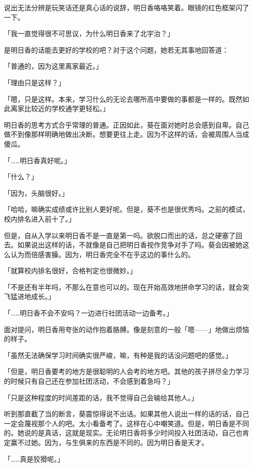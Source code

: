\documentclass[UTF8]{ctexart}
\begin{document}
    说出无法分辨是玩笑话还是真心话的说辞，明日香咯咯笑着。眼镜的红色框架闪了一下。

    「我一直觉得很不可思议，为什么明日香来了北宇治？」

    是明日香的话能去更好的学校的吧？对于这个问题，她若无其事地回答道：

    「普通的，因为这里离家最近。」

    「理由只是这样？」

    「嗯，只是这样。本来，学习什么的无论去哪所高中要做的事都是一样的。既然如此离家比较近的学校通学更轻松。」

    明日香的思考方式合乎常理的普通。正因如此，葵在面对她时总会感到自卑。自己做不到像那样明确地做出决断。想要更往上走。因为不这样的话，会被周围人当成傻瓜。

    「……明日香真好呢。」

    「什么？」

    「因为，头脑很好。」

    「哈哈，嘛确实成绩或许比别人更好呢。但是，葵不也是很优秀吗。之前的模试，校内排名进入前十了。」

    但是，自从入学以来明日香不是一直是第一吗。欲脱口而出的话，总之硬塞了回去。如果说出这样的话，不就像是自己把明日香视作竞争对手了吗。葵会因被她这么认为而倍感害臊。因为，明日香完全不在乎这边的事什么的。

    「就算校内排名很好，合格判定也很微妙。」

    「不是还有半年吗，不那么在意也可以的。现在开始高效地拼命学习的话，就会突飞猛进地成长。」

    「……明日香不会不安吗？一边进行社团活动一边备考。」

    面对提问，明日香用夸张的动作抱着胳膊。像是刻意的一般「嗯——」地做出烦恼的样子。

    「虽然无法确保学习时间确实很严峻，嘛，有种是我的话没问题吧的感觉。」

    「但是，明日香要考的地方是很聪明的人会考的地方吧。其他的孩子拼尽全力学习的时候只有自己还在参加社团活动，不会感到着急吗？」

    「只是这种程度的时间差距的话，我不觉得自己会输给其他人。」

    听到那直截了当的断言，葵震惊得说不出话。如果其他人说出一样的话的话，自己一定会蔑视那个人的吧。太小看备考了。这样在心中嘲笑道。但是，明日香是不同的。她说的是真话，这就是现实。无论明日香将多少时间投入社团活动，自己也肯定赢不过她。因为，与生俱来的东西是不同的。因为明日香是天才。

    「……真是狡猾呢。」
\end{document}
